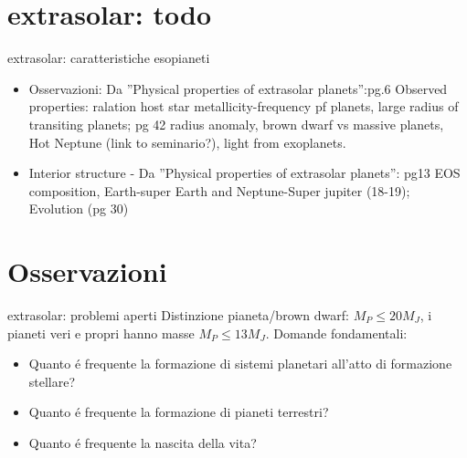 \section{extrasolar: todo}

\begin{frame}{extrasolar: caratteristiche esopianeti}\tolbf
\begin{itemize}
\item Osservazioni: Da ''Physical properties of extrasolar planets'':pg.6  Observed properties: ralation host star metallicity-frequency pf planets, large radius of transiting planets; pg 42 radius anomaly, brown dwarf vs massive planets, Hot Neptune (link to seminario?), light from exoplanets.
\item Interior structure - Da ''Physical properties of extrasolar planets'': pg13 EOS composition, Earth-super Earth and Neptune-Super jupiter (18-19); Evolution (pg 30)
\end{itemize}
\end{frame}

\section{Osservazioni}

\begin{wordonframe}{extrasolar: problemi aperti}
Distinzione pianeta/brown dwarf: $M_P\leq20M_J$, i pianeti veri e propri hanno masse $M_P\leq13M_J$.
Domande fondamentali:
\begin{itemize}
    \item Quanto \'e frequente la formazione di sistemi planetari all'atto di formazione stellare?
    \item Quanto \'e frequente la formazione di pianeti terrestri?
    \item Quanto \'e frequente la nascita della vita?
\end{itemize}
\end{wordonframe}